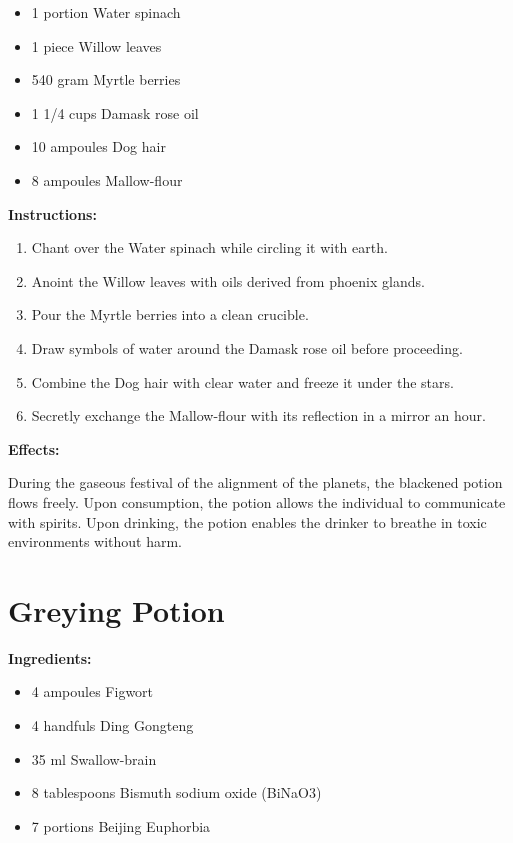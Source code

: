 \documentclass{article}
\begin{document}
\begin{itemize}
  \item 1 portion Water spinach
  \item 1 piece Willow leaves
  \item 540 gram Myrtle berries
  \item 1 1/4 cups Damask rose oil
  \item 10 ampoules Dog hair
  \item 8 ampoules Mallow-flour
\end{itemize}

\textbf{Instructions:}

\begin{enumerate}
  \item Chant over the Water spinach while circling it with earth.
  \item Anoint the Willow leaves with oils derived from phoenix glands.
  \item Pour the Myrtle berries into a clean crucible.
  \item Draw symbols of water around the Damask rose oil before proceeding.
  \item Combine the Dog hair with clear water and freeze it under the stars.
  \item Secretly exchange the Mallow-flour with its reflection in a mirror an hour.
\end{enumerate}

\textbf{Effects:}

During the gaseous festival of the alignment of the planets, the blackened potion flows freely. Upon consumption, the potion allows the individual to communicate with spirits. Upon drinking, the potion enables the drinker to breathe in toxic environments without harm.

\newpage
\section*{Greying Potion}

\textbf{Ingredients:}

\begin{itemize}
  \item 4 ampoules Figwort
  \item 4 handfuls Ding Gongteng
  \item 35 ml Swallow-brain
  \item 8 tablespoons Bismuth sodium oxide (BiNaO3)
  \item 7 portions Beijing Euphorbia
\end{itemize}
\end{document}
